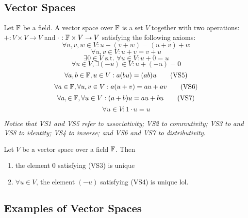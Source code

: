 \subsection{Vector Spaces}
\begin{mydef}\normalfont
Let \(\mathbb{F}\) be a field. A vector space over \(\mathbb{F}\) is a set \(V\) together with two operations: \(+: V\times V \to V\) and \(\cdot:\mathbb{F}\times V\to V\) satisfying the following axioms:
%
\begin{equation}\forall u,v,w\in V : u+(v+w)=(u+v)+w\tag{VS1}\end{equation}
\begin{equation}\forall u,v\in V : u+v=v+u\tag{VS2}\end{equation}
\begin{equation}\exists0\in V \text{ s.t. } \forall u\in V : u + 0 = u \tag{VS3}\end{equation}
\begin{equation}\forall u\in V, \exists(-u)\in V : u+(-u) = 0 \tag{VS4}\end{equation}
\begin{equation}\forall a,b \in \mathbb{F}, u \in V : a(bu) = (ab)u \tag{VS5}\end{equation}
\begin{equation}\forall a\in\mathbb{F}, \forall u,v\in V : a(u+v) = au+av \tag{VS6}\end{equation}
\begin{equation}\forall a,\in\mathbb{F}, \forall u\in V : (a+b)u = au+bu \tag{VS7}\end{equation}
\begin{equation}\forall u\in V : 1\cdot u=u \tag{VS8}\end{equation}

\textit{Notice that VS1 and VS5 refer to associativity; VS2 to commutivity; VS3 to and VS8 to identity; VS4 to inverse; and VS6 and VS7 to distributivity}.
\end{mydef}

\begin{mythm} \normalfont
Let \(V\) be a vector space over a field \(\mathbb{F}\). Then 
\begin{enumerate}
	\item the element 0 satisfying (VS3) is unique
	\item \(\forall u\in V\), the element \((-u)\) satisfying (VS4) is unique lol.
\end{enumerate}
\end{mythm}


\subsection{Examples of Vector Spaces}
